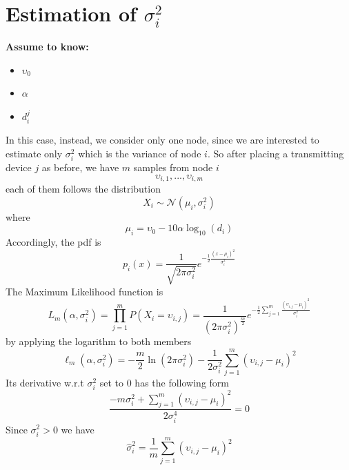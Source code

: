 \documentclass[12pt]{report}
\begin{document}
\section{Estimation of $\sigma^2_i$}
  \begin{center}
  \textbf{Assume to know:}
  \begin{itemize}
    \centering
    \item $\upsilon_0$
    \item $\alpha$
    \item $d_i^j$
  \end{itemize}
  \end{center}
In this case, instead, we consider only one node, since we are interested to estimate only $\sigma^2_i$ which is the variance of node $i$.
So after placing a transmitting device $j$ as before, we have $m$ samples from node $i$ $$\upsilon_{i,1},...,\upsilon_{i,m}$$ each of them follows the distribution
\begin{equation}
    X_i\sim \mathcal{N}(\mu_i,\sigma^2_i)
    \label{eq:24}
\end{equation}
where
\begin{equation}
    \mu_i = \upsilon_0-10\alpha\log_{10}(d_i)
\end{equation}
Accordingly, the pdf is
\begin{equation}
    p_{i}(x)=\frac{1}{\sqrt{2\pi\sigma_i^2}}e^{-\frac{1}{2}\frac{(x-\mu_i)^2}{\sigma^2_i}}
\end{equation}
The Maximum Likelihood function is
\begin{equation}
    L_m(\alpha,\sigma_i^2)=\prod_{j=1}^mP(X_i=\upsilon_{i,j})=
    \frac{1}{(2\pi\sigma_i^2)^{\frac{m}{2}}}e^{-\frac{1}{2}\sum_{j=1}^m\frac{(\upsilon_{i,j}-\mu_i)^2}{\sigma^2_i}}
\end{equation}
by applying the logarithm to both members
\begin{equation}
    \ell_m(\alpha,\sigma^2_i)=-\frac{m}{2}\ln(2\pi\sigma^2_i)-\frac{1}{2\sigma^2_i}\sum_{j=1}^m(\upsilon_{i,j}-\mu_i)^2
\end{equation}
Its derivative w.r.t $\sigma^2_i$ set to $0$ has the following form 
\begin{equation}
    \frac{-m\sigma^2_i+\sum_{j=1}^m(\upsilon_{i,j}-\mu_i)^2}{2\sigma^4_i}=0
\end{equation}
Since $\sigma^2_i>0$ we have
\begin{equation}
    \hat{\sigma}^2_i=\frac{1}{m}\sum_{j=1}^m(\upsilon_{i,j}-\mu_i)^2
\end{equation}
\end{document}
